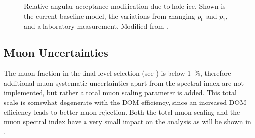 \begin{figure}
    \centering
    
    \caption[Hole ice angular acceptance modification]{Relative angular acceptance modification due to hole ice. Shown is the current baseline model, the variations from changing $p_0$ and $p_1$, and a laboratory measurement. Modified from \cite{ATrettin_phd}.}
\end{figure}


\subsection{Muon Uncertainties}

The muon fraction in the final level selection (see ) is below \SI{1}{\percent}, therefore additional muon systematic uncertainties apart from the spectral index are not implemented, but rather a total muon scaling parameter is added. This total scale is somewhat degenerate with the DOM efficiency, since an increased DOM efficiency leads to better muon rejection. Both the total muon scaling and the muon spectral index have a very small impact on the analysis as will be shown in .
